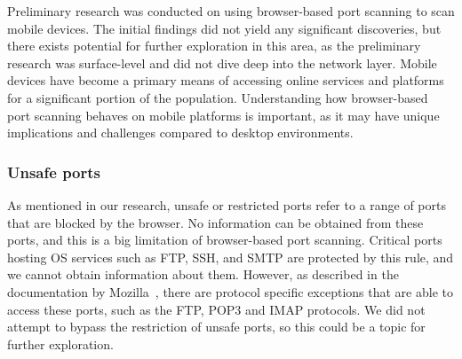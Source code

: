 Preliminary research was conducted on using browser-based port scanning to scan mobile devices. The initial findings did not yield any significant discoveries, but there exists potential for further exploration in this area, as the preliminary research was surface-level and did not dive deep into the network layer.
Mobile devices have become a primary means of accessing online services and platforms for a significant portion of the population. Understanding how browser-based port scanning behaves on mobile platforms is important, as it may have unique implications and challenges compared to desktop environments.

\subsubsection{Unsafe ports}
As mentioned in our research, unsafe or restricted ports refer to a range of ports that are blocked by the browser.
No information can be obtained from these ports, and this is a big limitation of browser-based port scanning. 
Critical ports hosting OS services such as FTP, SSH, and SMTP are protected by this rule, and we cannot obtain information about them.
However, as described in the documentation by Mozilla~\cite{firefox_restricted_ports}, there are protocol specific exceptions that are able to access these ports, such as the FTP, POP3 and IMAP protocols.
We did not attempt to bypass the restriction of unsafe ports, so this could be a topic for further exploration. 




